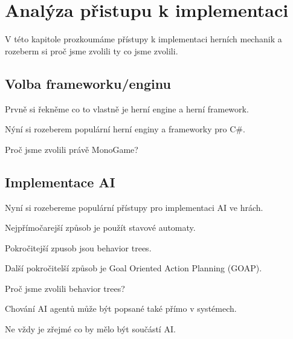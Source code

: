 
\chapter{Analýza přistupu k implementaci}

V této kapitole prozkoumáme přístupy k implementaci herních mechanik a rozeberm si proč jsme zvolili ty co jsme zvolili.

\section{Volba frameworku/enginu}

Prvně si řekněme co to vlastně je herní engine a herní framework.

Nýní si rozeberem populární herní enginy a frameworky pro C\#.

Proč jsme zvolili právě MonoGame?


\section{Implementace AI}

Nyní si rozebereme populární přístupy pro implementaci AI ve hrách.

Nejpřímočarejší způsob je použít stavové automaty.

Pokročitejší zpusob jsou behavior trees.

Další pokročitelší způsob je Goal Oriented Action Planning (GOAP).

Proč jsme zvolili behavior trees?

Chování AI agentů může být popsané také přímo v systémech.

Ne vždy je zřejmé co by mělo být součástí AI.


